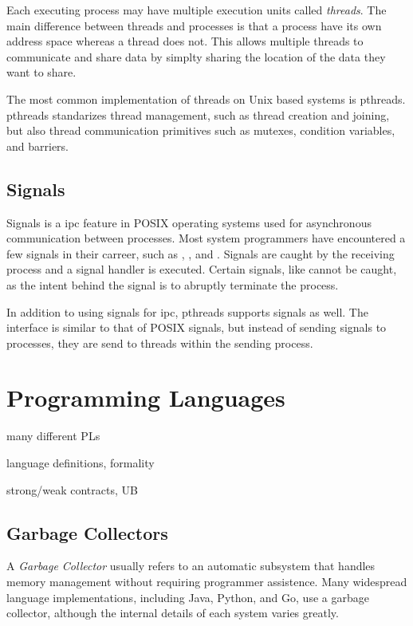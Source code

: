 Each executing process may have multiple execution units called \emph{threads}. The main difference
between threads and processes is that a process have its own address space whereas a thread does
not. This allows multiple threads to communicate and share data by simplty sharing the location of
the data they want to share.

The most common implementation of threads on Unix based systems is \gls{pthreads}. \gls{pthreads}
standarizes thread management, such as thread creation and joining, but also thread communication
primitives such as mutexes, condition variables, and barriers.


\subsection{Signals\label{sec:background-signals}}

Signals is a \gls{ipc} feature in POSIX operating systems used for asynchronous communication
between processes. Most system programmers have encountered a few signals in their carreer, such as
, ,  and . Signals are caught by the
receiving process and a signal handler is executed. Certain signals, like  cannot be
caught, as the intent behind the signal is to abruptly terminate the process.

In addition to using signals for \gls{ipc}, \gls{pthreads} supports signals as well. The interface
is similar to that of POSIX signals, but instead of sending signals to processes, they are send to
threads within the sending process.


\section{Programming Languages\label{sec:background-pl}}

many different PLs

language definitions, formality

strong/weak contracts, UB



\subsection{Garbage Collectors}

A \emph{Garbage Collector} usually refers to an automatic subsystem that handles memory management
without requiring programmer assistence. Many widespread language implementations,
including Java, Python, and Go, use a garbage collector, although the internal details of each
system varies greatly.

